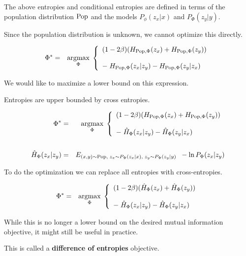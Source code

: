 {\vfill
The above entropies and conditional entropies are defined in terms of the population distribution $\mathrm{Pop}$ and the models $P_\phi(z_x|x)$ and $P_\Phi(z_y|y)$.

\vfill
Since the population distribution is unknown, we cannot optimize this directly.


{\huge
\begin{eqnarray*}
\Phi^* & = & \operatorname*{argmax}_{\Phi} \; \left\{\begin{array}{l}(1-2\beta)(H_{\mathrm{Pop},\Phi}(z_x)+ H_{\mathrm{Pop},\Phi}(z_y)) \\
\\
-\; H_{\mathrm{Pop},\Phi}(z_x|z_y) - H_{\mathrm{Pop},\Phi}(z_y|z_x) \end{array}\right.
\end{eqnarray*}
}

\vfill
We would like to maximize a lower bound on this expression.

\vfill
Entropies are upper bounded by cross entropies.

\vfill
{\huge
\begin{eqnarray*}
\Phi^* & = & \operatorname*{argmax}_{\Phi} \; \left\{\begin{array}{l}(1-2\beta)(H_{\mathrm{Pop},\Phi}(z_x)+ H_{\mathrm{Pop},\Phi}(z_y)) \\
\\
-\; \hat{H}_{\Phi}(z_x|z_y) - \hat{H}_{\Phi}(z_y|z_x) \end{array}\right.\\
\\
\hat{H}_\Phi(z_x|z_y) & = & E_{(x,y)\sim \mathrm{Pop},\;z_x\sim P_\Phi(z_x|x),\;z_y \sim P_\Phi(z_y|y)}\;\;-\ln P_\Phi(z_x|z_y)
\end{eqnarray*}
}



To do the optimization we can replace all entropies with cross-entropies.

\vfill
{\huge
\begin{eqnarray*}
\Phi^* & = & \operatorname*{argmax}_{\Phi} \; \left\{\begin{array}{l}(1-2\beta)(\hat{H}_{\Phi}(z_x)+ \hat{H}_{\Phi}(z_y)) \\
\\
-\; \hat{H}_{\Phi}(z_x|z_y) - \hat{H}_{\Phi}(z_y|z_x) \end{array}\right.
\end{eqnarray*}
}

\vfill
While this is no longer a lower bound on the desired mutual information objective, it might still be useful in practice.

\vfill
This is called a {\bf difference of entropies} objective.


}


